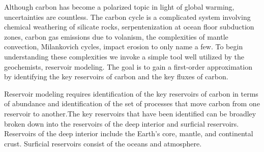 Although carbon has become a polarized topic in light of global warming, uncertainties are countless. The carbon cycle is a complicated system involving chemical weathering of silicate rocks, serpentenization at ocean floor subduction zones, carbon gas emissions due to volanism, the complexities of mantle convection, Milankovich cycles, impact erosion to only name a few. To begin understanding these complexities we invoke a simple tool well utilized by the geochemists, reservoir modeling. The goal is to gain a first-order approximation by identifying the key reservoirs of carbon and the key fluxes of carbon. 


Reservoir modeling requires identification of the key reservoirs of carbon in terms of abundance and identification of the set of processes that move carbon from one reservoir to another.The key reservoirs that have been identified can be broadley broken down into the reservoirs of the deep interior and surficial reservoirs. Reservoirs of the deep interior include the Earth's core, mantle, and continental crust. Surficial reservoirs consist of the oceans and atmosphere.


